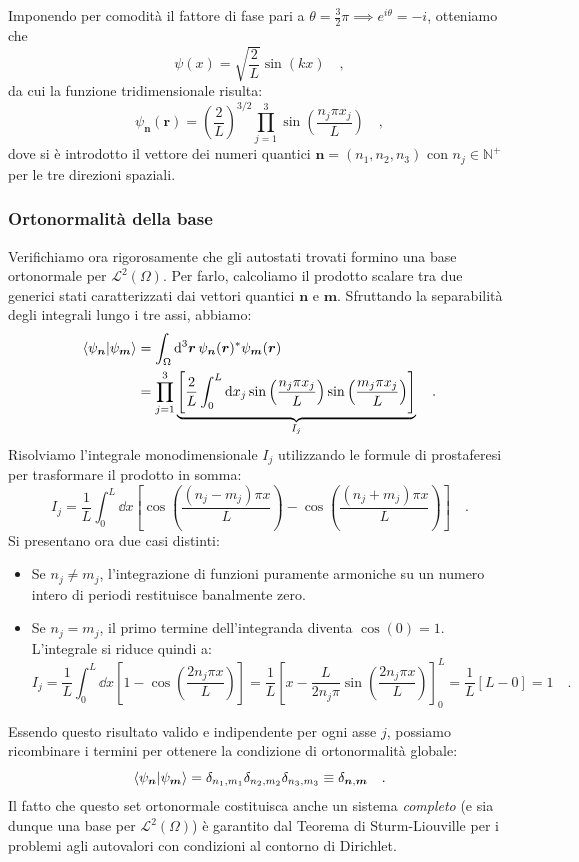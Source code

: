 Imponendo per comodità il fattore di fase pari a $\theta = \frac{3}{2}\pi \implies e^{i\theta} = -i$, otteniamo che 
\[
    \psi(x) = \sqrt{\frac{2}{L}}\sin(kx) \quad,
\]
da cui la funzione tridimensionale risulta:
\begin{equation}
    \psi_{\bm{n}}(\bm{r}) = \left( \frac{2}{L} \right)^{3/2} \prod_{j=1}^3 \sin\left( \frac{n_j \pi x_j}{L} \right) \quad,
\end{equation}
dove si è introdotto il vettore dei numeri quantici $\bm{n} = (n_1, n_2, n_3)$ con $n_j \in \mathbb{N}^+$ per le tre direzioni spaziali. 

\subsubsection{Ortonormalità della base}
Verifichiamo ora rigorosamente che gli autostati trovati formino una base ortonormale per $\mathcal{L}^2(\Omega)$. Per farlo, calcoliamo il prodotto scalare tra due generici stati caratterizzati dai vettori quantici $\bm{n}$ e $\bm{m}$. Sfruttando la separabilità degli integrali lungo i tre assi, abbiamo:
\[
\begin{aligned}
    \braket{\psi_{\bm{n}}}{\psi_{\bm{m}}} &= \int_{\Omega} \dd^3{\bm{r}} \, \psi_{\bm{n}}(\bm{r})^* \psi_{\bm{m}}(\bm{r}) \\
    &= \prod_{j=1}^3 \underbrace{\left[ \frac{2}{L} \int_0^L \dd{x_j} \sin\left( \frac{n_j \pi x_j}{L} \right) \sin\left( \frac{m_j \pi x_j}{L} \right) \right]}_{I_j} \quad.
\end{aligned}
\]
Risolviamo l'integrale monodimensionale $I_j$ utilizzando le formule di prostaferesi per trasformare il prodotto in somma:
\[
    I_j = \frac{1}{L} \int_0^L \dd{x} \left[ \cos\left( \frac{(n_j - m_j)\pi x}{L} \right) - \cos\left( \frac{(n_j + m_j)\pi x}{L} \right) \right] \quad.
\]
Si presentano ora due casi distinti:
\begin{itemize}
    \item Se $n_j \neq m_j$, l'integrazione di funzioni puramente armoniche su un numero intero di periodi restituisce banalmente zero.
    \item Se $n_j = m_j$, il primo termine dell'integranda diventa $\cos(0) = 1$. L'integrale si riduce quindi a:
    \[
        I_j = \frac{1}{L} \int_0^L \dd{x} \left[ 1 - \cos\left( \frac{2n_j\pi x}{L} \right) \right] = \frac{1}{L} \left[ x - \frac{L}{2n_j\pi}\sin\left( \frac{2n_j\pi x}{L} \right) \right]_0^L = \frac{1}{L} [L - 0] = 1 \quad.
    \]
\end{itemize}
Essendo questo risultato valido e indipendente per ogni asse $j$, possiamo ricombinare i termini per ottenere la condizione di ortonormalità globale:
\begin{equation}
    \braket{\psi_{\bm{n}}}{\psi_{\bm{m}}} = \delta_{n_1, m_1} \delta_{n_2, m_2} \delta_{n_3, m_3} \equiv \delta_{\bm{n},\bm{m}} \quad.
\end{equation}
Il fatto che questo set ortonormale costituisca anche un sistema \emph{completo} (e sia dunque una base per $\mathcal{L}^2(\Omega)$) è garantito dal Teorema di Sturm-Liouville per i problemi agli autovalori con condizioni al contorno di Dirichlet.  

